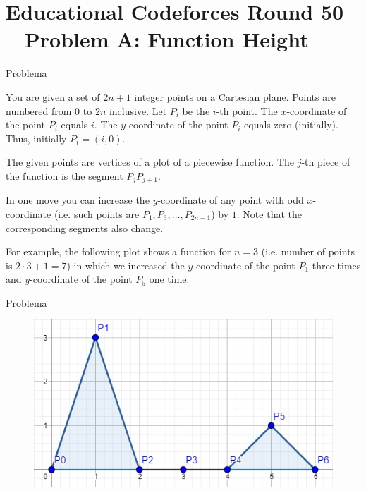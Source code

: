 \section{Educational Codeforces Round 50 -- Problem A: Function Height}

\begin{frame}[fragile]{Problema}

You are given a set of $2n+1$ integer points on a Cartesian plane. Points are numbered from $0$ to 
$2n$ inclusive. Let $P_i$ be the $i$-th point. The $x$-coordinate of the point $P_i$ equals $i$. 
The $y$-coordinate of the point $P_i$ equals zero (initially). Thus, initially $P_i=(i,0)$.

The given points are vertices of a plot of a piecewise function. The $j$-th piece of the function 
is the segment $P_jP_{j+1}$.

In one move you can increase the $y$-coordinate of any point with odd $x$-coordinate (i.e. such points are $P_1, P_3, \ldots, P_{2n-1}$) by $1$. Note that the corresponding segments also change.

For example, the following plot shows a function for $n=3$ (i.e. number of points is $2\cdot 3+1=7$) in which we increased the $y$-coordinate of the point $P_1$ three times and $y$-coordinate of the point $P_5$ one time:

\end{frame}

\begin{frame}[fragile]{Problema}
    \begin{figure}
        \centering
        \includegraphics[scale=0.6]{figure2.png}
    \end{figure}
\end{frame}

